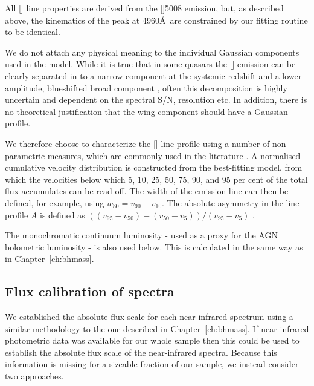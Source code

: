 All [] line properties are derived from the []5008 emission, but, as described above, the kinematics of the peak at 4960\AA\, are constrained by our fitting routine to be identical.

We do not attach any physical meaning to the individual Gaussian components used in the model. 
While it is true that in some quasars the [] emission can be clearly separated in to a narrow component at the systemic redshift and a lower-amplitude, blueshifted broad component \citep[e.g.][]{shen16a}, often this decomposition is highly uncertain and dependent on the spectral \ac{S/N}, resolution etc.
In addition, there is no theoretical justification that the wing component should have a Gaussian profile.  

We therefore choose to characterize the [] line profile using a number of non-parametric measures, which are commonly used in the literature \citep[e.g.][]{zakamska14,zakamska16}. 
A normalised cumulative velocity distribution is constructed from the best-fitting model, from which the velocities below which 5, 10, 25, 50, 75, 90, and 95 per cent of the total flux accumulates can be read off. 
The width of the emission line can then be defined, for example, using $w_{80} = v_{90} - v_{10}$. 
The absolute asymmetry in the line profile $A$ is defined as $((v_{95} - v_{50}) - (v_{50} - v_{5})) / (v_{95} - v_{5})$ \citep{zakamska14}. 

The monochromatic continuum luminosity - used as a proxy for the \ac{AGN} bolometric luminosity - is also used below. 
This is calculated in the same way as in Chapter~\ref{ch:bhmass}. 

\subsection{Flux calibration of spectra}

We established the absolute flux scale for each near-infrared spectrum using a similar methodology to the one described in Chapter~\ref{ch:bhmass}. 
If near-infrared photometric data was available for our whole sample then this could be used to establish the absolute flux scale of the near-infrared spectra. 
Because this information is missing for a sizeable fraction of our sample, we instead consider two approaches. 

